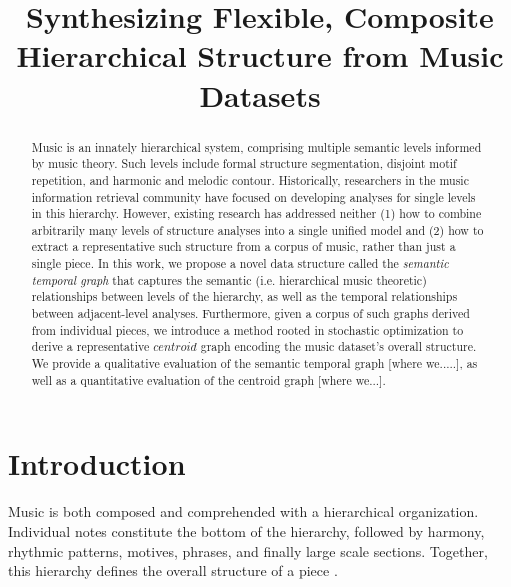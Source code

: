 \documentclass{article}
\title{Synthesizing Flexible, Composite Hierarchical Structure from Music Datasets}
\begin{document}
%
\maketitle
%


\begin{abstract}
Music is an innately hierarchical system, comprising multiple semantic levels informed by music theory. Such levels include formal structure segmentation, disjoint motif repetition, and harmonic and melodic contour. Historically, researchers in the music information retrieval community have focused on developing analyses for single levels in this hierarchy. However, existing research has addressed neither (1) how to combine arbitrarily many levels of structure analyses into a single unified model and (2) how to extract a representative such structure from a corpus of music, rather than just a single piece. In this work, we propose a novel data structure called the \textit{semantic temporal graph} that captures the semantic (i.e. hierarchical music theoretic) relationships between levels of the hierarchy, as well as the temporal relationships between adjacent-level analyses. Furthermore, given a corpus of such graphs derived from individual pieces, we introduce a method rooted in stochastic optimization to derive a representative $centroid$ graph encoding the music dataset's overall structure. We provide a qualitative evaluation of the semantic temporal graph [where we.....], as well as a quantitative evaluation of the centroid graph [where we...].
\end{abstract}


%
\section{Introduction}\label{sec:intro}
Music is both composed and comprehended with a hierarchical organization. Individual notes constitute the bottom of the hierarchy, followed by harmony, rhythmic patterns, motives, phrases, and finally large scale sections. Together, this hierarchy defines the overall structure of a piece \cite{msaf}.
\end{document}
